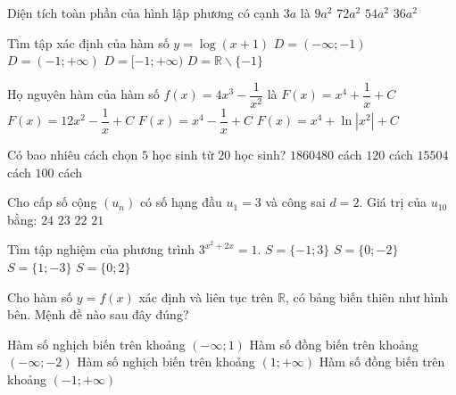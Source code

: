\begin{ex}%
Diện tích toàn phần của hình lập phương có cạnh $3 a$ là
\choice
{$9 a^2$}
{$72 a^2$}
{\True $54 a^2$}
{$36 a^2$}

\end{ex}
\begin{ex}%
Tìm tập xác định của hàm số $y=\log (x+1)$ 
\choice
{$D=(-\infty;-1)$}
{\True $D=(-1;+\infty)$}
{$D=[-1;+\infty)$}
{$D=\mathbb{R} \backslash\{-1\}$}

\end{ex}
\begin{ex}%
Họ nguyên hàm của hàm số $f(x)=4 x^3-\dfrac{1}{x^2}$ là
\choice
{\True $F(x)=x^4+\dfrac{1}{x}+C$}
{$F(x)=12 x^2-\dfrac{1}{x}+C$}
{$F(x)=x^4-\dfrac{1}{x}+C$}
{$F(x)=x^4+\ln \left|x^2\right|+C$}

\end{ex}
\begin{ex}%
Có bao nhiêu cách chọn $5$ học sinh từ $20$ học sinh?
\choice
{$1860480$ cách}
{$120$ cách}
{\True $15504$ cách}
{$100$ cách}

\end{ex}
\begin{ex}%
Cho cấp số cộng $\left(u_n\right)$ có số hạng đầu $u_1=3$ và công sai $d=2$. Giá trị của $u_{10}$ bằng:
\choice
{$24$}
{$23$}
{$22$}
{\True $21$}

\end{ex}
\begin{ex}%
Tìm tập nghiệm của phương trình $3^{x^2+2 x}=1$.
\choice
{$S=\{-1; 3\}$}
{\True $S=\{0;-2\}$}
{$S=\{1;-3\}$}
{$S=\{0; 2\}$}

\end{ex}
\begin{ex}%
Cho hàm số $y=f(x)$ xác định và liên tục trên $\mathbb{R}$, có bảng biến thiên như hình bên. Mệnh đề nào sau đây đúng?
\begin{center}
\end{center}
\choice
{Hàm số nghịch biến trên khoảng $(-\infty; 1)$}
{\True Hàm số đồng biến trên khoảng $(-\infty;-2)$}
{Hàm số nghịch biến trên khoảng $(1;+\infty)$}
{Hàm số đồng biến trên khoảng $(-1;+\infty)$}
\end{ex}
